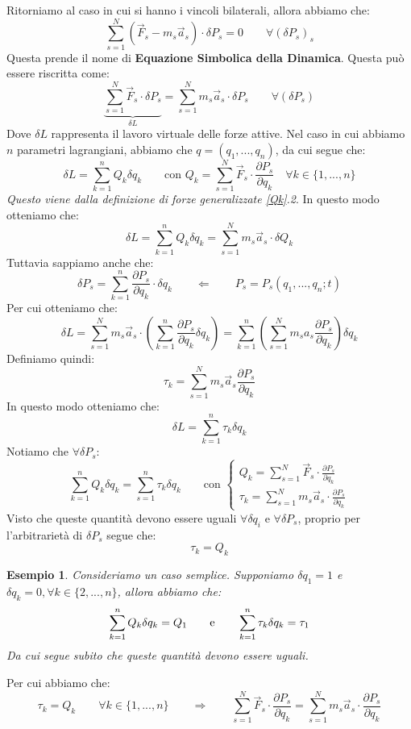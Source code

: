 \documentclass[11pt,a4paper,twoside]{article}
\newtheorem{es}{Esempio}
\theoremstyle{definition}
\begin{document}
Ritorniamo al caso in cui si hanno i vincoli bilaterali, allora abbiamo che:
\[ \sum_{s=1}^N (\vec F_s - m_s \vec a_s) \cdot \delta P_s = 0 \qquad \forall (\delta P_s)_s \]
Questa prende il nome di \textbf{Equazione Simbolica della Dinamica}. Questa può essere riscritta come:
\[ \underbrace{\sum_{s=1}^N \vec F_s \cdot \delta P_s}_{\delta L} = \sum_{s=1}^N m_s \vec a_s \cdot \delta P_s \qquad \forall (\delta P_s) \]
Dove $\delta L$ rappresenta il lavoro virtuale delle forze attive. Nel caso in cui abbiamo $n$ parametri lagrangiani, abbiamo che $q = (q_1,...,q_n)$, da cui segue che:
\[ \delta L = \sum_{k=1}^n Q_k \delta q_k\qquad \text{con }Q_k = \sum_{s=1}^N \vec F_s \cdot \frac{\partial P_s}{\partial q_k} \quad \forall k \in \{1,...,n\} \]
\textit{Questo viene dalla definizione di forze generalizzate \ref{Qk}.2}. In questo modo otteniamo che:
\[ \delta L = \sum_{k=1}^n Q_k \delta q_k = \sum_{s=1}^N m_s \vec a_s \cdot \delta Q_k \]
Tuttavia sappiamo anche che:
\[ \delta P_s = \sum_{k=1}^n \frac{\partial P_s}{\partial q_k} \cdot \delta q_k \qquad \Leftarrow \qquad P_s = P_s(q_1,...,q_n;t) \]
Per cui otteniamo che:
\[ \delta L = \sum_{s=1}^N m_s \vec a_s \cdot \left( \sum_{k=1}^n \frac{\partial P_s}{\partial q_k}\delta q_k \right) = \sum_{k=1}^n \left( \sum_{s=1}^N m_s a_s \frac{\partial P_s}{\partial q_k} \right) \delta q_k \]
Definiamo quindi:
\[ \tau_k = \sum_{s=1}^N m_s \vec a_s \frac{\partial P_s}{\partial q_k} \]
In questo modo otteniamo che:
\[ \delta L = \sum_{k=1}^n \tau_k \delta q_k \]
Notiamo che $\forall \delta P_s$:
\[ \sum_{k=1}^n Q_k \delta q_k = \sum_{s=1}^n \tau_k \delta q_k \qquad \text{con }\begin{cases}
	Q_k = \sum_{s=1}^N \vec F_s \cdot \frac{\partial P_s}{\partial q_k}\\
	\tau_k = \sum_{s=1}^N m_s \vec a_s \cdot \frac{\partial P_s}{\partial q_k}
\end{cases} \]
Visto che queste quantità devono essere uguali $\forall \delta q_i$ e $\forall \delta P_s$, proprio per l'arbitrarietà di $\delta P_s$ segue che:
\[ \tau_k = Q_k \]

\begin{es}
	Consideriamo un caso semplice. Supponiamo $\delta q_1=1$ e $\delta q_k = 0, \forall k \in \{2,...,n\}$, allora abbiamo che:
	\[ \sum_{k=1}^n Q_k \delta q_k = Q_1 \qquad \text e \qquad \sum_{k=1}^n \tau_k \delta q_k = \tau_1 \]
	Da cui segue subito che queste quantità devono essere uguali.
\end{es}

Per cui abbiamo che:
\[ \tau_k = Q_k \qquad \forall k \in \{1,...,n\} \qquad \Rightarrow \qquad \sum_{s=1}^N \vec F_s \cdot \frac{\partial P_s}{\partial q_k} = \sum_{s=1}^N m_s \vec a_s \cdot \frac{\partial P_s}{\partial q_k} \]
\end{document}
